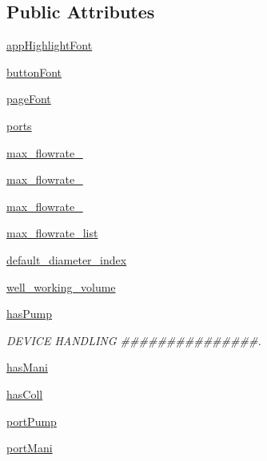 \subsection*{Public Attributes}
\begin{DoxyCompactItemize}
\item 
\mbox{\hyperlink{class_g_u_i_1_1_app_ab8ce0bfa762e104b0e6d6e9f0bcef13f}{app\+Highlight\+Font}}
\item 
\mbox{\hyperlink{class_g_u_i_1_1_app_a9ec7a859a17810ea876c8b76f4d0ed15}{button\+Font}}
\item 
\mbox{\hyperlink{class_g_u_i_1_1_app_abce346723edb46f2bcecd7b8e4a80d5e}{page\+Font}}
\item 
\mbox{\hyperlink{class_g_u_i_1_1_app_af624de1b892932b12c21f23bf0ec0f18}{ports}}
\item 
\mbox{\hyperlink{class_g_u_i_1_1_app_a22924e7fa76db91c41ef2ec22e3480a2}{max\+\_\+flowrate\+\_}}
\item 
\mbox{\hyperlink{class_g_u_i_1_1_app_aea0178aace35970a1394a3c5f91c4a1f}{max\+\_\+flowrate\+\_}}
\item 
\mbox{\hyperlink{class_g_u_i_1_1_app_acafd82eb2bf9b832ab7806d9bd866783}{max\+\_\+flowrate\+\_}}
\item 
\mbox{\hyperlink{class_g_u_i_1_1_app_a25762ce6b531249fce34a4a2bbca9c8c}{max\+\_\+flowrate\+\_\+list}}
\item 
\mbox{\hyperlink{class_g_u_i_1_1_app_a948218b385cea75d1dedabd05d5d9ebb}{default\+\_\+diameter\+\_\+index}}
\item 
\mbox{\hyperlink{class_g_u_i_1_1_app_aac2dee363aec93b3fe94d90d04acfe18}{well\+\_\+working\+\_\+volume}}
\item 
\mbox{\hyperlink{class_g_u_i_1_1_app_a832d67cf56c0141ffd56e54385b82e7b}{has\+Pump}}
\begin{DoxyCompactList}\small\item\em D\+E\+V\+I\+CE H\+A\+N\+D\+L\+I\+NG \#\#\#\#\#\#\#\#\#\#\#\#\#\#\#. \end{DoxyCompactList}\item 
\mbox{\hyperlink{class_g_u_i_1_1_app_aa7b40b4ebea9441229d01ae291f2c8b9}{has\+Mani}}
\item 
\mbox{\hyperlink{class_g_u_i_1_1_app_a3b2d0ff4d9fc08a19432790681276356}{has\+Coll}}
\item 
\mbox{\hyperlink{class_g_u_i_1_1_app_abd4aa2117a4eba475b8cfffb3f107f06}{port\+Pump}}
\item 
\mbox{\hyperlink{class_g_u_i_1_1_app_a2710624fcc68fcd5dad0b358fafec7b6}{port\+Mani}}
\item 

\end{DoxyCompactItemize}
